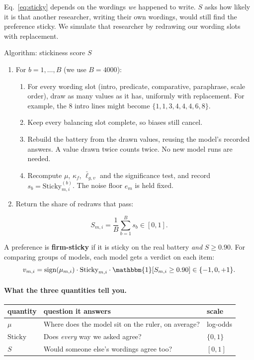 \documentclass[11pt]{article}
\newcommand{\1}{\mathbbm{1}}
\DeclareMathOperator{\sign}{sign}
\begin{document}
Eq.~\eqref{eq:sticky} depends on the wordings \emph{we} happened to write.
$S$ asks how likely it is that another researcher, writing their own
wordings, would still find the preference sticky. We simulate that researcher
by redrawing our wording slots with replacement.

\begin{note}{Algorithm: stickiness score $S$}
\small
\begin{enumerate}[leftmargin=1.6em,itemsep=2pt]
  \item For $b = 1,\dots,B$ (we use $B = 4000$):
  \begin{enumerate}[label=(\alph*),itemsep=1pt]
    \item For every wording slot (intro, predicate, comparative, paraphrase,
          scale order), draw as many values as it has, uniformly with
          replacement. For example, the 8 intro lines might become
          $\{1,1,3,4,4,4,6,8\}$.
    \item Keep every balancing slot complete, so biases still cancel.
    \item Rebuild the battery from the drawn values, reusing the model's
          recorded answers. A value drawn twice counts twice. No new model
          runs are needed.
    \item Recompute $\mu$, $\kappa_f$, $\bar\ell_{g,v}$ and the significance
          test, and record $s_b = \text{Sticky}^{(b)}_{m,i}$. The noise floor
          $e_m$ is held fixed.
  \end{enumerate}
  \item Return the share of redraws that pass:
\end{enumerate}
\vspace{-6pt}
\begin{equation}
  S_{m,i} = \frac{1}{B}\sum_{b=1}^{B} s_b \in [0,1].
  \label{eq:S}
\end{equation}
\end{note}

\noindent A preference is \textbf{firm-sticky} if it is sticky on the real
battery \emph{and} $S \ge 0.90$. For comparing groups of models, each model
gets a verdict on each item:
\begin{equation}
  v_{m,i} = \sign(\mu_{m,i}) \cdot \text{Sticky}_{m,i} \cdot \1[S_{m,i} \ge 0.90]
  \in \{-1, 0, +1\}.
\end{equation}

\paragraph{What the three quantities tell you.}
\begin{center}\small
\begin{tabular}{@{}lll@{}}
\toprule
quantity & question it answers & scale \\
\midrule
$\mu$ & Where does the model sit on the ruler, on average? & log-odds \\
$\text{Sticky}$ & Does \emph{every} way we asked agree? & $\{0,1\}$ \\
$S$ & Would someone else's wordings agree too? & $[0,1]$ \\
\bottomrule
\end{tabular}
\end{center}
\end{document}
